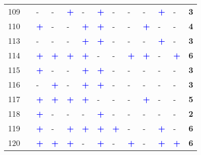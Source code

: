 \begin{longtable}{p{0.5cm}p{4.6cm}p{0.3cm}p{0.3cm}p{0.3cm}p{0.3cm}p{0.3cm}p{0.3cm}p{0.3cm}p{0.3cm}p{0.3cm}p{0.3cm}p{1cm}}
    \small{109} & \small{\textcite{lee_strategies_2010}}\index{Lee, Jaeyeong|pagebf} & - & - & \textcolor{blue}{\textbf{+}} & - & \textcolor{blue}{\textbf{+}} & - & - & - & \textcolor{blue}{\textbf{+}} & - & \textbf{3}\\
    \small{110} & \small{\textcite{lee_forecasting_2021}}\index{Lee, Mina|pagebf} & \textcolor{blue}{\textbf{+}} & - & - & \textcolor{blue}{\textbf{+}} & \textcolor{blue}{\textbf{+}} & - & - & \textcolor{blue}{\textbf{+}} & - & - & \textbf{4}\\
    \small{113} & \small{\textcite{li_unbalanced_2022}}\index{Li, Lili|pagebf} & - & - & - & \textcolor{blue}{\textbf{+}} & \textcolor{blue}{\textbf{+}} & - & - & - & \textcolor{blue}{\textbf{+}} & - & \textbf{3}\\
    \small{114} & \small{\textcite{li_exploring_2017}}\index{Li, Wenxiang|pagebf} & \textcolor{blue}{\textbf{+}} & \textcolor{blue}{\textbf{+}} & \textcolor{blue}{\textbf{+}} & \textcolor{blue}{\textbf{+}} & - & - & \textcolor{blue}{\textbf{+}} & \textcolor{blue}{\textbf{+}} & - & \textcolor{blue}{\textbf{+}} & \textbf{6}\\
    \small{115} & \small{\textcite{li_exploring_2021}}\index{Li, Wei|pagebf} & \textcolor{blue}{\textbf{+}} & - & - & \textcolor{blue}{\textbf{+}} & \textcolor{blue}{\textbf{+}} & - & - & - & - & - & \textbf{3}\\
    \small{116} & \small{\textcite{li_factors_2020}}\index{Li, Xuefeng|pagebf} & - & \textcolor{blue}{\textbf{+}} & - & \textcolor{blue}{\textbf{+}} & \textcolor{blue}{\textbf{+}} & - & - & - & - & - & \textbf{3}\\
    \small{117} & \small{\textcite{li_investigating_2022}}\index{Li, Xiaofeng|pagebf} & \textcolor{blue}{\textbf{+}} & \textcolor{blue}{\textbf{+}} & \textcolor{blue}{\textbf{+}} & \textcolor{blue}{\textbf{+}} & - & - & - & \textcolor{blue}{\textbf{+}} & - & - & \textbf{5}\\
    \small{118} & \small{\textcite{li_operating_2019}} & \textcolor{blue}{\textbf{+}} & - & - & - & \textcolor{blue}{\textbf{+}} & - & - & - & - & - & \textbf{2}\\
    \small{119} & \small{\textcite{lin_analysis_2019}}\index{Lin, Diao|pagebf} & \textcolor{blue}{\textbf{+}} & - & \textcolor{blue}{\textbf{+}} & \textcolor{blue}{\textbf{+}} & \textcolor{blue}{\textbf{+}} & \textcolor{blue}{\textbf{+}} & - & - & \textcolor{blue}{\textbf{+}} & - & \textbf{6}\\
    \small{120} & \small{\textcite{lin_built_2018}}\index{Lin, Jen-Jia|pagebf} & \textcolor{blue}{\textbf{+}} & \textcolor{blue}{\textbf{+}} & \textcolor{blue}{\textbf{+}} & - & \textcolor{blue}{\textbf{+}} & - & \textcolor{blue}{\textbf{+}} & - & \textcolor{blue}{\textbf{+}} & \textcolor{blue}{\textbf{+}} & \textbf{6}\\

\end{longtable}
